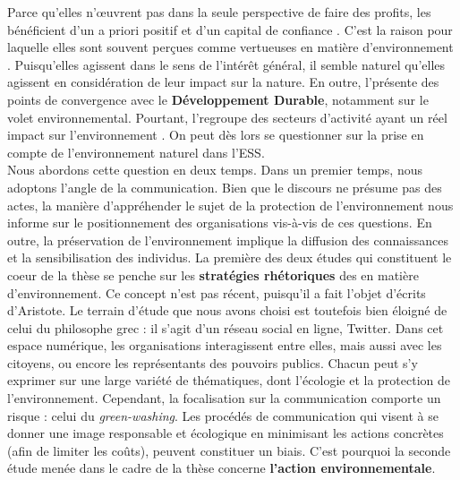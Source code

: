 Parce qu'elles n'œuvrent pas dans la seule perspective de faire des profits, les \eess bénéficient d'un a priori positif et d'un capital de confiance \parencite{hansmann1980role}. C'est la raison pour laquelle elles sont souvent perçues comme vertueuses en matière d'environnement \parencite{cretieneau2010economie}. Puisqu'elles agissent dans le sens de l'intérêt général, il semble naturel qu'elles agissent en considération de leur impact sur la nature. En outre, l'\ess présente des points de convergence avec le \textbf{Développement Durable}, notamment sur le volet environnemental. Pourtant, l'\ess regroupe des secteurs d'activité ayant un réel impact sur l'environnement \parencite{dart2010green}. On peut dès lors se questionner sur la prise en compte de l'environnement naturel dans l'ESS. \\

Nous abordons cette question en deux temps. Dans un premier temps, nous adoptons l'angle de la communication. Bien que le discours ne présume pas des actes, la manière d'appréhender le sujet de la protection de l'environnement nous informe sur le positionnement des organisations vis-à-vis de ces questions. En outre, la préservation de l'environnement implique la diffusion des connaissances et la sensibilisation des individus. La première des deux études qui constituent le coeur de la thèse se penche sur les \textbf{stratégies rhétoriques} des \oess en matière d'environnement. Ce concept n'est pas récent, puisqu'il a fait l'objet d'écrits d'Aristote. Le terrain d'étude que nous avons choisi est toutefois bien éloigné de celui du philosophe grec : il s'agit d'un réseau social en ligne, Twitter. Dans cet espace numérique, les organisations interagissent entre elles, mais aussi avec les citoyens, ou encore les représentants des pouvoirs publics. Chacun peut s'y exprimer sur une large variété de thématiques, dont l'écologie et la protection de l'environnement. Cependant, la focalisation sur la communication comporte un risque : celui du \textit{green-washing}. Les procédés de communication qui visent à se donner une image responsable et écologique en minimisant les actions concrètes (afin de limiter les coûts), peuvent constituer un biais. C'est pourquoi la seconde étude menée dans le cadre de la thèse concerne \textbf{l'action environnementale}. \\

